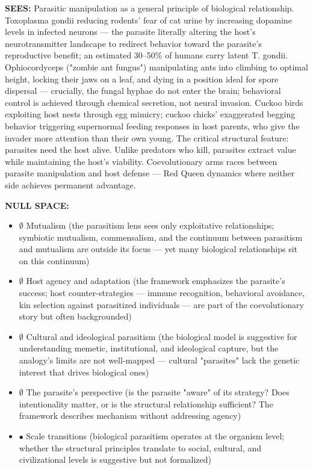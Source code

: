 \textbf{SEES:} Parasitic manipulation as a general principle of biological relationship. Toxoplasma gondii reducing rodents' fear of cat urine by increasing dopamine levels in infected neurons — the parasite literally altering the host's neurotransmitter landscape to redirect behavior toward the parasite's reproductive benefit; an estimated 30–50\% of humans carry latent T. gondii. Ophiocordyceps ("zombie ant fungus") manipulating ants into climbing to optimal height, locking their jaws on a leaf, and dying in a position ideal for spore dispersal — crucially, the fungal hyphae do not enter the brain; behavioral control is achieved through chemical secretion, not neural invasion. Cuckoo birds exploiting host nests through egg mimicry; cuckoo chicks' exaggerated begging behavior triggering supernormal feeding responses in host parents, who give the invader more attention than their own young. The critical structural feature: parasites need the host alive. Unlike predators who kill, parasites extract value while maintaining the host's viability. Coevolutionary arms races between parasite manipulation and host defense — Red Queen dynamics where neither side achieves permanent advantage.


\textbf{NULL SPACE:}

\begin{itemize}[nosep,leftmargin=*]
  \item $\emptyset$ Mutualism (the parasitism lens sees only exploitative relationships; symbiotic mutualism, commensalism, and the continuum between parasitism and mutualism are outside its focus — yet many biological relationships sit on this continuum)
  \item $\emptyset$ Host agency and adaptation (the framework emphasizes the parasite's success; host counter-strategies — immune recognition, behavioral avoidance, kin selection against parasitized individuals — are part of the coevolutionary story but often backgrounded)
  \item $\emptyset$ Cultural and ideological parasitism (the biological model is suggestive for understanding memetic, institutional, and ideological capture, but the analogy's limits are not well-mapped — cultural "parasites" lack the genetic interest that drives biological ones)
  \item $\emptyset$ The parasite's perspective (is the parasite "aware" of its strategy? Does intentionality matter, or is the structural relationship sufficient? The framework describes mechanism without addressing agency)
  \item $\bullet$ Scale transitions (biological parasitism operates at the organism level; whether the structural principles translate to social, cultural, and civilizational levels is suggestive but not formalized)
\end{itemize}


